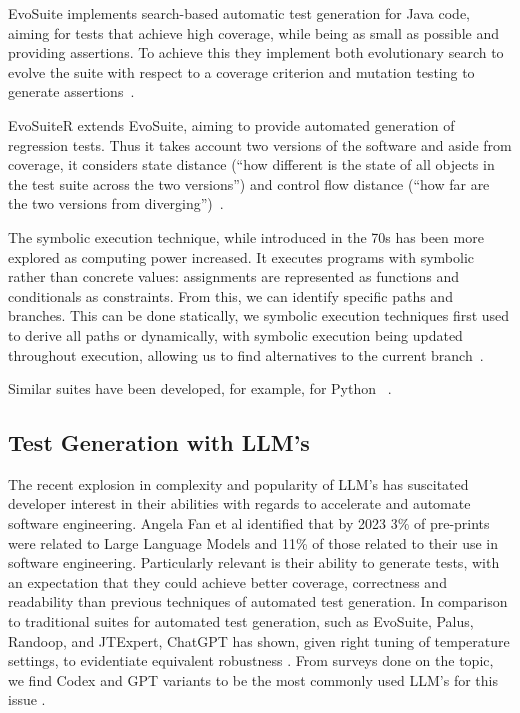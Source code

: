 EvoSuite implements search-based automatic test generation for Java code, aiming for tests that achieve high coverage, while being as small as possible and providing assertions. To achieve this they implement both evolutionary search to evolve the suite with respect to a coverage criterion and mutation testing to generate assertions~\citep{kn:evosuite}.

EvoSuiteR extends EvoSuite, aiming to provide automated generation of regression tests. Thus it takes account two versions of the software and aside from coverage, it considers state distance (``how different is the state of
all objects in the test suite across the two versions'') and control flow distance (``how
far are the two versions from diverging'')~\citep{kn:evosuiter}.

The symbolic execution technique, while introduced in the 70s has been more explored as computing power increased. It executes programs with symbolic rather than concrete values: assignments are represented as functions and conditionals as constraints. From this, we can identify specific paths and branches. This can be done statically, we symbolic execution techniques first used to derive all paths or dynamically, with symbolic execution being updated throughout execution, allowing us to find alternatives to the current branch~\citep{kn:symbolicexec}.


Similar suites have been developed, for example, for Python ~\citep{kn:pynguin}.

\subsection{Test Generation with LLM's}

The recent explosion in complexity and popularity of LLM's has suscitated developer interest in their abilities with regards to accelerate and automate software engineering. Angela Fan et al identified that by 2023 3\% of pre-prints were related to Large Language Models and 11\% of those related to their use in software engineering\cite{kn:angela}. Particularly relevant is their ability to generate tests, with an expectation that they could achieve better coverage, correctness and readability than previous techniques of automated test generation\cite{kn:junjiewang}.
In comparison to traditional suites for automated test generation, such as EvoSuite, Palus, Randoop, and JTExpert, ChatGPT has shown, given right tuning of temperature settings, to evidentiate equivalent robustness \cite{kn:gptunitbra}.
From surveys done on the topic, we find Codex and GPT variants to be the most commonly used LLM's for this issue \cite{kn:junjiewang}.

